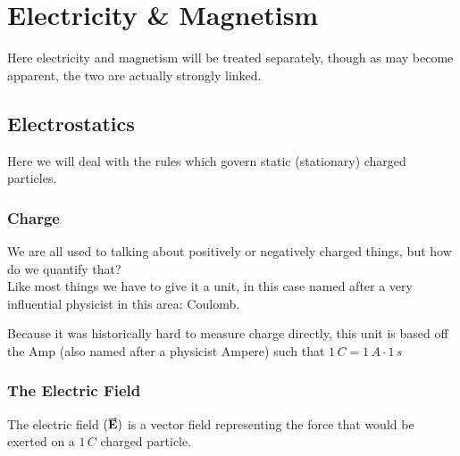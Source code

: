 \documentclass[main.tex]{subfiles}
\begin{document}
    \chapter{Electricity \& Magnetism}
        \label{ch: Electricity and Magnetism}
        \thispagestyle{noheader}
        Here electricity and magnetism will be treated separately, though as may become apparent, the two are actually strongly linked.

        \section{Electrostatics}
            \label{sec: Electrostatics}
            Here we will deal with the rules which govern static (stationary) charged particles.

            \subsection{Charge}
                \label{subsec: Charge}
                We are all used to talking about positively or negatively charged things, but how do we quantify that?\\
                Like most things we have to give it a unit, in this case named after a very influential physicist in this area: Coulomb.

                Because it was historically hard to measure charge directly, this unit is based off the Amp (also named after a physicist Ampere) such that $1\,C = 1\,A \cdot 1\,s$

            \subsection{The Electric Field}
                \label{subsec: The Electric Field}

                The electric field $(\vect{E})$ is a vector field representing the force that would be exerted on a $1\,C$ charged particle.
\end{document}
